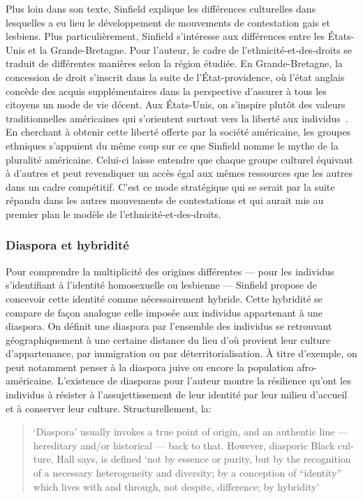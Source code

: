 Plus loin dans son texte, Sinfield explique les différences culturelles dans lesquelles a eu lieu le développement de mouvements de contestation gais et lesbiens. 
Plus particulièrement, Sinfield s'intéresse aux différences entre les États-Unis et la Grande-Bretagne. 
Pour l'auteur, le cadre de l'ethnicité-et-des-droits se traduit de différentes manières selon la région étudiée. 
En Grande-Bretagne, la concession de droit s'inscrit dans la suite de l'État-providence, où l'état anglais concède des acquis supplémentaires dans la perspective d'assurer à tous les citoyens un mode de vie décent. 
Aux États-Unis, on s'inspire plutôt des valeurs traditionnelles américaines qui s'orientent surtout vers la liberté aux individus~\citep[274]{Sinfield1996}. 
En cherchant à obtenir cette liberté offerte par la société américaine, les groupes ethniques s'appuient du même coup sur ce que Sinfield nomme le mythe de la pluralité américaine. 
Celui-ci laisse entendre que chaque groupe culturel équivaut à d'autres et peut revendiquer un accès égal aux mêmes ressources que les autres dans un cadre compétitif. 
C'est ce mode stratégique qui se serait par la suite répandu dans les autres mouvements de contestations et qui aurait  mis au premier plan le modèle de l'ethnicité-et-des-droits.

\subsubsection{Diaspora et hybridité}
\label{sub:diaspora_et_hybridit_} Pour comprendre la multiplicité des origines différentes --- pour les individus s'identifiant à l'identité homosexuelle ou lesbienne --- Sinfield propose de concevoir cette identité comme nécessairement hybride. 
Cette hybridité se compare de façon analogue celle imposée aux individus appartenant à une diaspora. 
On définit une diaspora par l'ensemble des individus se retrouvant géographiquement à une certaine distance du lieu d'où provient leur culture d'appartenance, par immigration ou par déterritorialisation. 
À titre d'exemple, on peut notamment penser à la diaspora juive ou encore la population afro-américaine.
L'existence de diasporas pour l'auteur montre la résilience qu'ont les individus à résister à l'assujettissement de leur identité par leur milieu d'accueil et à conserver leur culture. 
Structurellement, la: \foreignblockquote{english}[{\cite[278]{Sinfield1996}}][.]{`Diaspora' \textelp{} usually invokes a true point of origin, and an authentic line --- hereditary and/or historical --- back to that. However, diasporic Black culture, Hall says, is defined `not by essence or purity, but by the recognition of a necessary heterogeneity and diversity; by a conception of ``identity'' which lives with and through, not despite, difference; by hybridity'}

